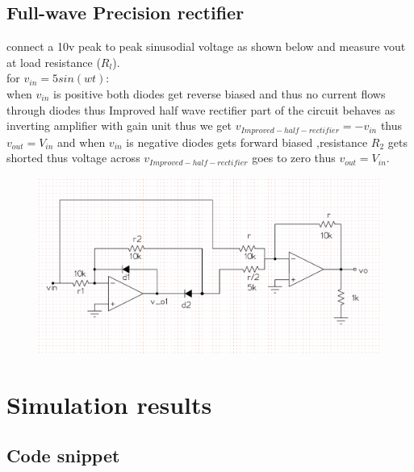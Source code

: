 \documentclass[12pt]{article}
\begin{document}
\subsection{Full-wave Precision rectifier}
connect a 10v peak to peak sinusodial voltage as shown below and measure vout at load resistance (\(R_{l}\)).\\
for \(v_{in}=5sin(wt)\):\\
when \(v_{in}\) is positive both diodes get reverse biased and thus no current flows through diodes thus Improved half wave rectifier part of the circuit behaves as inverting amplifier with gain unit thus we get \(v_{Improved-half-rectifier} = -v_{in}\) thus \(v_{out}=V_{in}\) and when \(v_{in}\) is negative diodes gets forward biased ,resistance \(R_{2}\) gets shorted thus voltage across \(v_{Improved-half-rectifier}\) goes to zero thus \(v_{out}=V_{in}\). 
\begin{figure}[h!]
\centering
\includegraphics[scale = 0.4]{full_wave_rectifier.png}
\end{figure}
\newpage

 
\section{Simulation results}%
\subsection{Code snippet}
\end{document}
